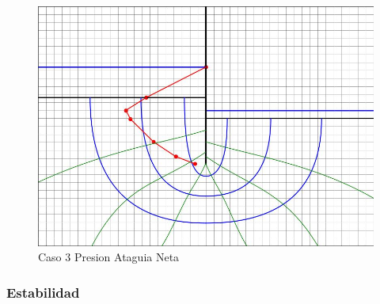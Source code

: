 \begin{figure}[H]
\begin{minipage}{0.32\textwidth}
        \includegraphics[width=\textwidth]{GRAFICOS/caso_3_presion_ataguia_neta.jpg}
        \caption{Caso 3 Presion Ataguia Neta}
    \end{minipage}
\end{figure}

\subsubsection{Estabilidad}

